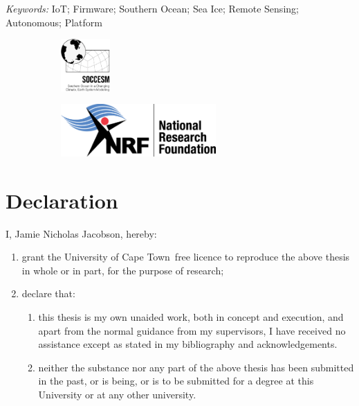 \documentclass[a4paper, 12pt, oneside, openright, parskip=full]{book}
\newcommand{\auth}{Jamie Nicholas Jacobson}								%
\newcommand{\uni}{University of Cape Town}				%
\newcommand{\key}{IoT; Firmware; Southern Ocean; Sea Ice; Remote Sensing; Autonomous; Platform}					   %
\begin{document}
\begin{titlepage}
		\vskip 5mm	
	\begin{normalsize}			
		{\itshape Keywords:}
		\key			
	\end{normalsize}

	\begin{figure}[H]
			\begin{subfigure}[b]{0.5\textwidth}
				\raggedright
				\includegraphics[height=2cm]{soccesm-logo.png}
			\end{subfigure}%
					\begin{subfigure}[b]{0.5\textwidth}
			\raggedleft
			\includegraphics[height=2cm]{NRF LOGO.png}
		\end{subfigure}%

	\end{figure}
\end{titlepage}

\frontmatter
\chapter{Declaration}				
\label{ch:decl}
I, \auth,  hereby:

\begin{enumerate}
	\item		grant the \uni\  free licence to reproduce the above thesis in whole or in part, for the purpose of research;
	\item		declare that:
	
	\begin{enumerate}
		\item		this thesis is my own unaided work, both in concept and execution, and apart from the normal guidance from my supervisors, I have received no assistance except as stated in my bibliography and acknowledgements.

		\item		neither the substance nor any part of the above thesis has been submitted in the past, or is being, or is to be submitted for a degree at this University or at any other university.
	\end{enumerate}	
\end{enumerate}
\end{document}
